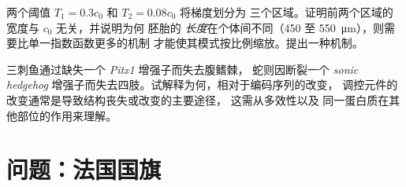 \begin{exercise}[$\star\star\star$]\label{exo:b3:developmental-genetics:11}
两个阈值 $T_{1} = 0.3c_{0}$ 和 $T_{2} = 0.08c_{0}$ 将梯度划分为
三个区域。证明前两个区域的宽度与 $c_{0}$ 无关，并说明为何
胚胎的
\emph{长度}在个体间不同（\qty{450}{} 至
\qty{550}{\micro m}），则需要比单一指数函数更多的机制
才能使其模式按比例缩放。提出一种机制。
\end{exercise}

\begin{exercise}[$\star\star\star$]\label{exo:b3:developmental-genetics:12}
三刺鱼通过缺失一个 \emph{Pitx1} 增强子而失去腹鳍棘，
蛇则因断裂一个 \emph{sonic hedgehog} 增强子而失去四肢。试解释为何，相对于编码序列的改变，
调控元件的改变通常是导致结构丧失或改变的主要途径，
这需从多效性以及
同一蛋白质在其他部位的作用来理解。
\end{exercise}

\section{问题：法国国旗}

